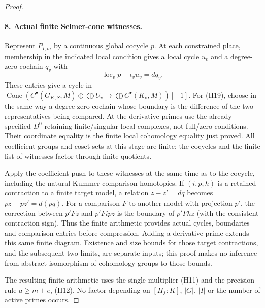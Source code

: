 \documentclass[11pt]{article}
\theoremstyle{definition}
\theoremstyle{remark}
\begin{document}
\begin{proof}
\paragraph{8. Actual finite Selmer-cone witnesses.}
Represent $P_{I,m}$ by a continuous global cocycle $p$.
At each constrained place, membership in the indicated local
condition gives a local cycle $u_v$ and a degree-zero cochain
$q_v$ with
\[
                   \operatorname{loc}_v p-\iota_vu_v=dq_v.
                                                               \tag{H22}
\]
These entries give a cycle in
$\operatorname{Cone}(C^\bullet(G_{K,S},M)\oplus\bigoplus U_v
\to\bigoplus C^\bullet(K_v,M))[-1]$.
For (H19), choose in the same way a degree-zero cochain whose
boundary is the difference of the two representatives being
compared. At the derivative primes use the already specified
$D^0$-retaining finite/singular local complexes, not full/zero
conditions. Their coordinate equality is the finite local
cohomology equality just proved. All coefficient groups and
coset sets at this stage are finite; the cocycles and the finite
list of witnesses factor through finite quotients.

Apply the coefficient push to these witnesses at the same time
as to the cocycle, including the natural Kummer comparison
homotopies. If $(i,p,h)$ is a retained contraction to a finite
target model, a relation $z-z'=dq$ becomes
$pz-pz'=d(pq)$. For a comparison $F$ to another model with
projection $p'$, the correction between $p'Fz$ and $p'Fi pz$
is the boundary of $p'Fhz$ (with the consistent contraction sign).
Thus the finite arithmetic provides actual cycles, boundaries
and comparison entries before compression. Adding a derivative
prime extends this same finite diagram. Existence and size
bounds for those target contractions, and the subsequent two
limits, are separate inputs; this proof makes no inference
from abstract isomorphism of cohomology groups to those bounds.

The resulting finite arithmetic uses the single multiplier (H11)
and the precision rule $a\ge m+e$, (H12). No factor depending on
$[H_f:K]$, $|G|$, $|I|$ or the number of active primes occurs.
\end{proof}
\end{document}
